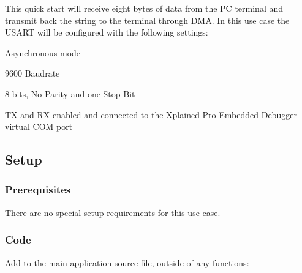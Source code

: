 This quick start will receive eight bytes of data from the P\+C terminal and transmit back the string to the terminal through D\+M\+A. In this use case the U\+S\+A\+R\+T will be configured with the following settings\+:
\begin{DoxyItemize}
\item Asynchronous mode
\item 9600 Baudrate
\item 8-\/bits, No Parity and one Stop Bit
\item T\+X and R\+X enabled and connected to the Xplained Pro Embedded Debugger virtual C\+O\+M port
\end{DoxyItemize}\hypertarget{asfdoc_sam0_sercom_usart_dma_use_case_asfdoc_sam0_sercom_usart_dma_use_case_setup}{}\subsection{Setup}\label{asfdoc_sam0_sercom_usart_dma_use_case_asfdoc_sam0_sercom_usart_dma_use_case_setup}
\hypertarget{asfdoc_sam0_sercom_usart_dma_use_case_asfdoc_sam0_sercom_usart_dma_use_case_prereq}{}\subsubsection{Prerequisites}\label{asfdoc_sam0_sercom_usart_dma_use_case_asfdoc_sam0_sercom_usart_dma_use_case_prereq}
There are no special setup requirements for this use-\/case.\hypertarget{asfdoc_sam0_sercom_usart_dma_use_case_asfdoc_sam0_usart_dma_use_case_setup_code}{}\subsubsection{Code}\label{asfdoc_sam0_sercom_usart_dma_use_case_asfdoc_sam0_usart_dma_use_case_setup_code}
Add to the main application source file, outside of any functions\+: 
\begin{DoxyCodeInclude}
\end{DoxyCodeInclude}

\begin{DoxyCodeInclude}
\end{DoxyCodeInclude}

\begin{DoxyCodeInclude}
\end{DoxyCodeInclude}

